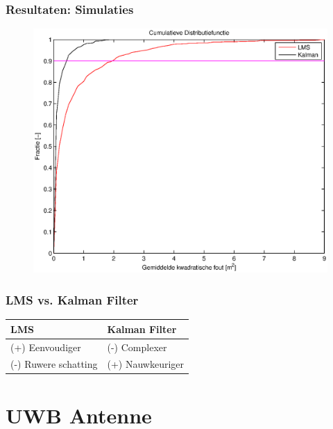 \documentclass{beamer}
\begin{document}
  \begin{frame}
    \frametitle{Resultaten: Simulaties}
    \begin{figure}
      \begin{center}
        \includegraphics[width=.6\linewidth]{images/simulatie_cumulatief.eps}
      \end{center}
    \end{figure}
  \end{frame}
  \begin{frame}
    \frametitle{LMS vs. Kalman Filter}
    \begin{center}
    \begin{tabular}{|l|l|}
      \hline
      LMS & Kalman Filter \\
      \hline
      (+) Eenvoudiger & (-) Complexer \\
      (-) Ruwere schatting & (+) Nauwkeuriger \\
      \hline
    \end{tabular}
    \end{center}
  \end{frame}


\section{UWB Antenne}
\end{document}
